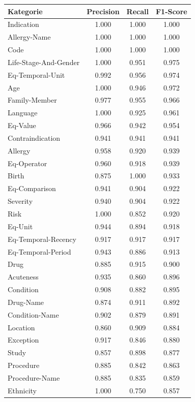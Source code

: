\begin{table}[htbp]
\centering
\begin{tabular}{p{5cm}ccc}
\toprule
\textbf{Kategorie} & \textbf{Precision} & \textbf{Recall} & \textbf{F1-Score} \\
\midrule
Indication & 1.000 & 1.000 & 1.000 \\
Allergy-Name & 1.000 & 1.000 & 1.000 \\
Code & 1.000 & 1.000 & 1.000 \\
Life-Stage-And-Gender & 1.000 & 0.951 & 0.975 \\
Eq-Temporal-Unit & 0.992 & 0.956 & 0.974 \\
Age & 1.000 & 0.946 & 0.972 \\
Family-Member & 0.977 & 0.955 & 0.966 \\
Language & 1.000 & 0.925 & 0.961 \\
Eq-Value & 0.966 & 0.942 & 0.954 \\
Contraindication & 0.941 & 0.941 & 0.941 \\
Allergy & 0.958 & 0.920 & 0.939 \\
Eq-Operator & 0.960 & 0.918 & 0.939 \\
Birth & 0.875 & 1.000 & 0.933 \\
Eq-Comparison & 0.941 & 0.904 & 0.922 \\
Severity & 0.940 & 0.904 & 0.922 \\
Risk & 1.000 & 0.852 & 0.920 \\
Eq-Unit & 0.944 & 0.894 & 0.918 \\
Eq-Temporal-Recency & 0.917 & 0.917 & 0.917 \\
Eq-Temporal-Period & 0.943 & 0.886 & 0.913 \\
Drug & 0.885 & 0.915 & 0.900 \\
Acuteness & 0.935 & 0.860 & 0.896 \\
Condition & 0.908 & 0.882 & 0.895 \\
Drug-Name & 0.874 & 0.911 & 0.892 \\
Condition-Name & 0.902 & 0.879 & 0.891 \\
Location & 0.860 & 0.909 & 0.884 \\
Exception & 0.917 & 0.846 & 0.880 \\
Study & 0.857 & 0.898 & 0.877 \\
Procedure & 0.885 & 0.842 & 0.863 \\
Procedure-Name & 0.885 & 0.835 & 0.859 \\
Ethnicity & 1.000 & 0.750 & 0.857 \\

\end{tabular}
\end{table}
